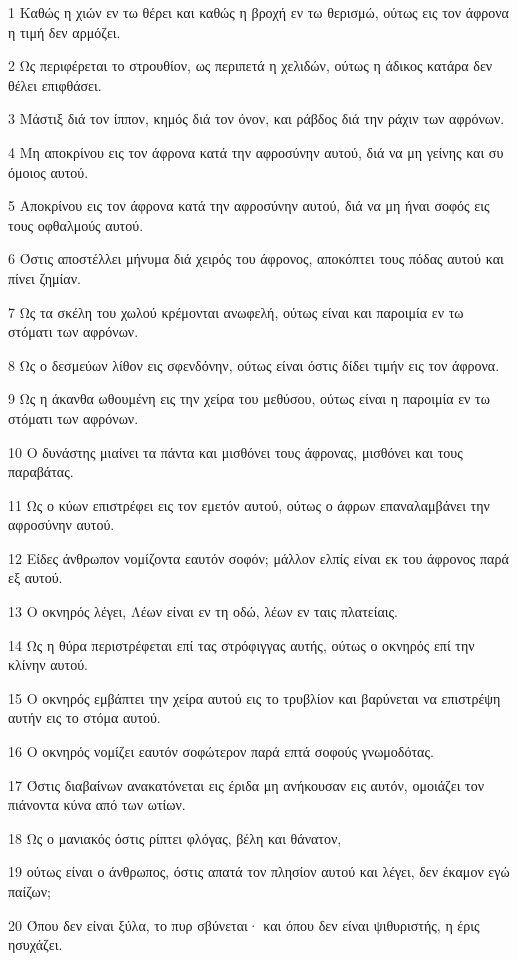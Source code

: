 \par 1 Καθώς η χιών εν τω θέρει και καθώς η βροχή εν τω θερισμώ, ούτως εις τον άφρονα η τιμή δεν αρμόζει.
\par 2 Ως περιφέρεται το στρουθίον, ως περιπετά η χελιδών, ούτως η άδικος κατάρα δεν θέλει επιφθάσει.
\par 3 Μάστιξ διά τον ίππον, κημός διά τον όνον, και ράβδος διά την ράχιν των αφρόνων.
\par 4 Μη αποκρίνου εις τον άφρονα κατά την αφροσύνην αυτού, διά να μη γείνης και συ όμοιος αυτού.
\par 5 Αποκρίνου εις τον άφρονα κατά την αφροσύνην αυτού, διά να μη ήναι σοφός εις τους οφθαλμούς αυτού.
\par 6 Όστις αποστέλλει μήνυμα διά χειρός του άφρονος, αποκόπτει τους πόδας αυτού και πίνει ζημίαν.
\par 7 Ως τα σκέλη του χωλού κρέμονται ανωφελή, ούτως είναι και παροιμία εν τω στόματι των αφρόνων.
\par 8 Ως ο δεσμεύων λίθον εις σφενδόνην, ούτως είναι όστις δίδει τιμήν εις τον άφρονα.
\par 9 Ως η άκανθα ωθουμένη εις την χείρα του μεθύσου, ούτως είναι η παροιμία εν τω στόματι των αφρόνων.
\par 10 Ο δυνάστης μιαίνει τα πάντα και μισθόνει τους άφρονας, μισθόνει και τους παραβάτας.
\par 11 Ως ο κύων επιστρέφει εις τον εμετόν αυτού, ούτως ο άφρων επαναλαμβάνει την αφροσύνην αυτού.
\par 12 Είδες άνθρωπον νομίζοντα εαυτόν σοφόν; μάλλον ελπίς είναι εκ του άφρονος παρά εξ αυτού.
\par 13 Ο οκνηρός λέγει, Λέων είναι εν τη οδώ, λέων εν ταις πλατείαις.
\par 14 Ως η θύρα περιστρέφεται επί τας στρόφιγγας αυτής, ούτως ο οκνηρός επί την κλίνην αυτού.
\par 15 Ο οκνηρός εμβάπτει την χείρα αυτού εις το τρυβλίον και βαρύνεται να επιστρέψη αυτήν εις το στόμα αυτού.
\par 16 Ο οκνηρός νομίζει εαυτόν σοφώτερον παρά επτά σοφούς γνωμοδότας.
\par 17 Όστις διαβαίνων ανακατόνεται εις έριδα μη ανήκουσαν εις αυτόν, ομοιάζει τον πιάνοντα κύνα από των ωτίων.
\par 18 Ως ο μανιακός όστις ρίπτει φλόγας, βέλη και θάνατον,
\par 19 ούτως είναι ο άνθρωπος, όστις απατά τον πλησίον αυτού και λέγει, δεν έκαμον εγώ παίζων;
\par 20 Όπου δεν είναι ξύλα, το πυρ σβύνεται· και όπου δεν είναι ψιθυριστής, η έρις ησυχάζει.
